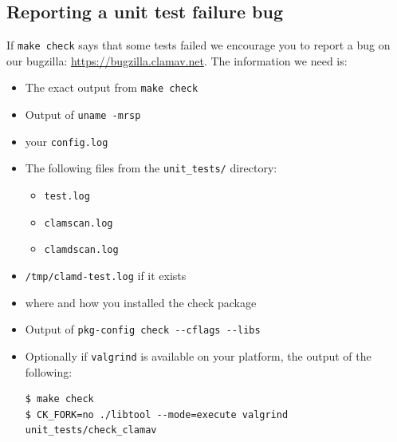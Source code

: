 \documentclass[a4paper,titlepage,12pt]{article}
\begin{document}
    \subsection{Reporting a unit test failure bug}
	If \verb+make check+ says that some tests failed we encourage you to report a bug on our bugzilla: \url{https://bugzilla.clamav.net}.
	The information we need is:
	\begin{itemize}
	 \item The exact output from \verb+make check+	 
	 \item Output of \verb+uname -mrsp+ 
	 \item your \verb+config.log+	 
	 \item The following files from the \verb+unit_tests/+ directory:
		\begin{itemize}
			\item \verb+test.log+
	 		\item \verb+clamscan.log+
			\item \verb+clamdscan.log+
		\end{itemize}
	 \item \verb+/tmp/clamd-test.log+ if it exists
         \item where and how you installed the check package
	 \item Output of \verb+pkg-config check --cflags --libs+
	 \item Optionally if \verb+valgrind+ is available on your platform, the output of the following:
	 \begin{verbatim}
$ make check
$ CK_FORK=no ./libtool --mode=execute valgrind unit_tests/check_clamav
	 \end{verbatim}	
	\end{itemize}
\end{document}
